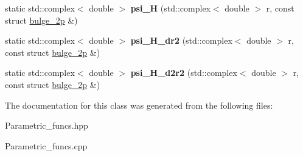 \begin{DoxyCompactItemize}
static std\+::complex$<$ double $>$ {\bfseries psi\+\_\+H} (std\+::complex$<$ double $>$ r, const struct \hyperlink{structbulge__2p}{bulge\+\_\+2p} \&)
\item 
\mbox{\label{classParametric__funcs_ab02a5302fd6db1539e4a29d430370380}} 
static std\+::complex$<$ double $>$ {\bfseries psi\+\_\+\+H\+\_\+dr2} (std\+::complex$<$ double $>$ r, const struct \hyperlink{structbulge__2p}{bulge\+\_\+2p} \&)
\item 
\mbox{\label{classParametric__funcs_a8e663fb60e664f232a5779dc107782a6}} 
static std\+::complex$<$ double $>$ {\bfseries psi\+\_\+\+H\+\_\+d2r2} (std\+::complex$<$ double $>$ r, const struct \hyperlink{structbulge__2p}{bulge\+\_\+2p} \&)
\end{DoxyCompactItemize}


The documentation for this class was generated from the following files\+:\begin{DoxyCompactItemize}
\item 
Parametric\+\_\+funcs.\+hpp\item 
Parametric\+\_\+funcs.\+cpp\end{DoxyCompactItemize}
